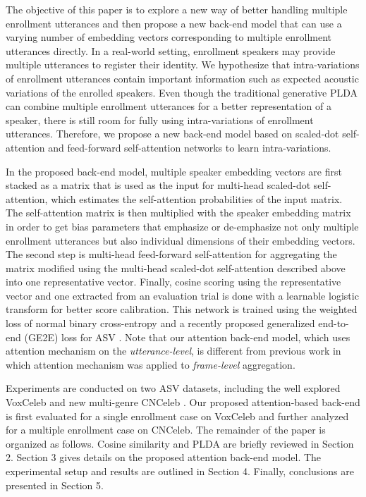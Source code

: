 \documentclass{article}
\begin{document}
The objective of this paper is to explore a new way of better handling multiple enrollment utterances and then propose a new back-end model that can use a varying number of embedding vectors corresponding to multiple enrollment utterances directly. 
In a real-world setting, enrollment speakers may provide multiple utterances to register their identity. 
We hypothesize that intra-variations of enrollment utterances contain important information such as expected acoustic variations of the enrolled speakers. Even though the traditional generative PLDA can combine multiple enrollment utterances for a better representation of a speaker, there is still room for fully using intra-variations of enrollment utterances.
Therefore, we propose a new back-end model based on scaled-dot self-attention and feed-forward self-attention networks to learn intra-variations. 

In the proposed back-end model, multiple speaker embedding vectors are first stacked as a matrix that is used as the input for multi-head scaled-dot self-attention, which estimates the self-attention probabilities of the input matrix. The self-attention matrix is then multiplied with the speaker embedding matrix in order to get bias parameters that emphasize or de-emphasize not only multiple enrollment utterances but also individual dimensions of their embedding vectors. The second step is multi-head feed-forward self-attention for aggregating the matrix modified using the multi-head scaled-dot self-attention described above into one representative vector. Finally, cosine scoring using the representative vector and one extracted from an evaluation trial is done with a learnable logistic transform for better score calibration. This network is trained using the weighted loss of normal binary cross-entropy and a recently proposed generalized end-to-end (GE2E) loss for ASV \cite{ge2e}. Note that our attention back-end model, which uses attention mechanism on the \textit{utterance-level}, is different from previous work \cite{asp,povey-sa} in which attention mechanism was applied to \textit{frame-level} aggregation.

Experiments are conducted on two ASV datasets, including the well explored VoxCeleb \cite{Nagrani2017-VOX1,Chung2018-VOX2} and new multi-genre CNCeleb \cite{Fan2020-CN1, Li2020-CN2}. Our proposed attention-based back-end is first evaluated for a single enrollment case on VoxCeleb and further analyzed for a multiple enrollment case on CNCeleb. 
The remainder of the paper is organized as follows. Cosine similarity and PLDA are briefly reviewed in Section 2. Section 3 gives details on the proposed attention back-end model. The experimental setup and results are outlined in Section 4. Finally, conclusions are presented in Section 5.
\vspace{-1mm}
\end{document}
